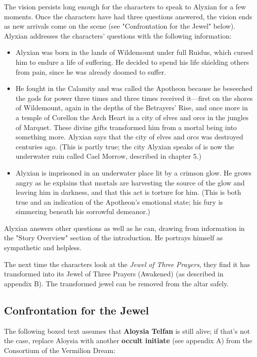 \documentclass[10pt,a4paper,twoside,bg=print,twocolumn,openany,nodeprecatedcode]{dndbook}
\begin{document}
The vision persists long enough for the characters to speak to Alyxian for a few moments. Once the characters have had three questions answered, the vision ends as new arrivals come on the scene (see "Confrontation for the Jewel" below). Alyxian addresses the characters' questions with the following information:


\begin{itemize}
\item Alyxian was born in the lands of Wildemount under full Ruidus, which cursed him to endure a life of suffering. He decided to spend his life shielding others from pain, since he was already doomed to suffer.
\item He fought in the Calamity and was called the Apotheon because he beseeched the gods for power three times and three times received it—first on the shores of Wildemount, again in the depths of the Betrayers' Rise, and once more in a temple of Corellon the Arch Heart in a city of elves and orcs in the jungles of Marquet. These divine gifts transformed him from a mortal being into something more. Alyxian says that the city of elves and orcs was destroyed centuries ago. (This is partly true; the city Alyxian speaks of is now the underwater ruin called Cael Morrow, described in chapter 5.)
\item Alyxian is imprisoned in an underwater place lit by a crimson glow. He grows angry as he explains that mortals are harvesting the source of the glow and leaving him in darkness, and that this act is torture for him. (This is both true and an indication of the Apotheon's emotional state; his fury is simmering beneath his sorrowful demeanor.)
\end{itemize}

Alyxian answers other questions as well as he can, drawing from information in the "Story Overview" section of the introduction. He portrays himself as sympathetic and helpless.

The next time the characters look at the \textit{Jewel of Three Prayers}, they find it has transformed into its Jewel of Three Prayers (Awakened) (as described in appendix B). The transformed jewel can be removed from the altar safely.

\subsection{Confrontation for the Jewel}
The following boxed text assumes that \textbf{Aloysia Telfan} is still alive; if that's not the case, replace Aloysia with another \textbf{occult initiate} (see appendix A) from the Consortium of the Vermilion Dream:
\end{document}
